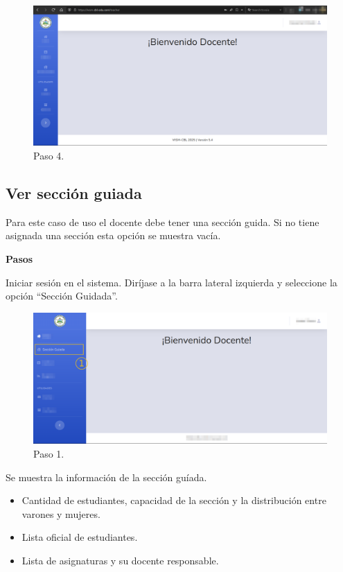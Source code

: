 \documentclass[12pt]{article}
\begin{document}
    \begin{figure}[H]
        \centering
        \includegraphics[width=\textwidth]{image/login.03}
        \caption{Paso 4.}
        \label{fig:login3}
    \end{figure}


    \subsection{Ver sección guiada}

    Para este caso de uso el docente debe tener una sección guida.
    Si no tiene asignada una sección esta opción se muestra vacía.

    \textbf{\large Pasos}\par

     Iniciar sesión en el sistema.
     Diríjase a la barra lateral izquierda y seleccione la opción ``Sección Guidada''.

    \begin{figure}[H]
        \centering
        \includegraphics[width=\textwidth]{image/view.enrollment.guide.01}
        \caption{Paso 1.}
    \end{figure}

     Se muestra la información de la sección guíada.
    \begin{itemize}
        \item Cantidad de estudiantes, capacidad de la sección y la distribución entre varones y mujeres.
        \item Lista oficial de estudiantes.
        \item Lista de asignaturas y su docente responsable.
    \end{itemize}
\end{document}
